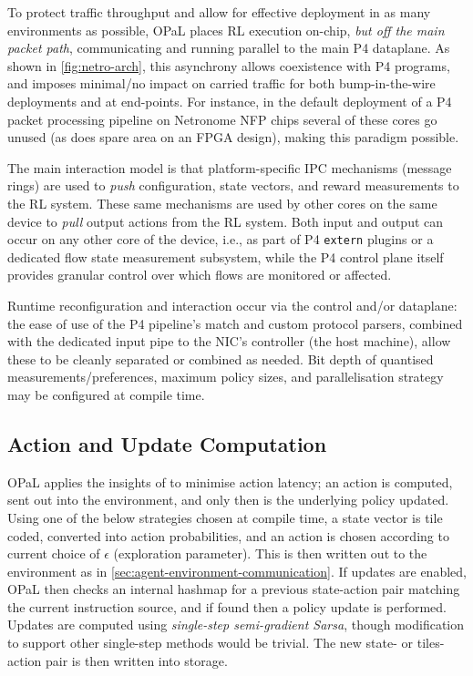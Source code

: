 \documentclass[sigconf,natbib=false]{acmart}
\newcommand{\approachshort}{OPaL}
\begin{document}

To protect traffic throughput and allow for effective deployment in as many environments as possible, \approachshort{} places RL execution on-chip, \emph{but off the main packet path}, communicating and running parallel to the main P4 dataplane.
As shown in \cref{fig:netro-arch}, this asynchrony allows coexistence with P4 programs, and imposes minimal/no impact on carried traffic for both bump-in-the-wire deployments and at end-points.
For instance, in the default deployment of a P4 packet processing pipeline on Netronome NFP chips several of these cores go unused (as does spare area on an FPGA design), making this paradigm possible.

The main interaction model is that platform-specific IPC mechanisms (message rings) are used to \emph{push} configuration, state vectors, and reward measurements to the RL system.
These same mechanisms are used by other cores on the same device to \emph{pull} output actions from the RL system.
Both input and output can occur on any other core of the device, i.e., as part of P4 \texttt{extern} plugins or a dedicated flow state measurement subsystem, while the P4 control plane itself provides granular control over which flows are monitored or affected.

Runtime reconfiguration and interaction occur via the control and/or dataplane: the ease of use of the P4 pipeline's match and custom protocol parsers, combined with the dedicated input pipe to the NIC's controller (the host machine), allow these to be cleanly separated or combined as needed.
Bit depth of quantised measurements/preferences, maximum policy sizes, and parallelisation strategy may be configured at compile time.

\subsection{Action and Update Computation}
\approachshort{} applies the insights of \textcite{DBLP:journals/firai/TravnikMSP18} to minimise action latency; an action is computed, sent out into the environment, and only then is the underlying policy updated.
Using one of the below strategies chosen at compile time, a state vector is tile coded, converted into action probabilities, and an action is chosen according to current choice of $\epsilon$ (exploration parameter).
This is then written out to the environment as in \cref{sec:agent-environment-communication}.
If updates are enabled, \approachshort{} then checks an internal hashmap for a previous state-action pair matching the current instruction source, and if found then a policy update is performed.
Updates are computed using \emph{single-step semi-gradient Sarsa}, though modification to support other single-step methods would be trivial.
The new state- or tiles-action pair is then written into storage.
\end{document}
